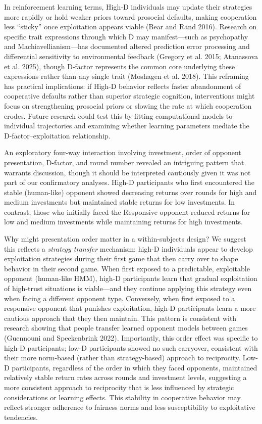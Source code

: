 \documentclass[
]{article}
\begin{document}
In reinforcement learning terms, High-D individuals may update their strategies more rapidly or hold weaker priors toward prosocial defaults, making cooperation less ``sticky'' once exploitation appears viable (Bear and Rand 2016).
Research on specific trait expressions through which D may manifest---such as psychopathy and Machiavellianism---has documented altered prediction error processing and differential sensitivity to environmental feedback (Gregory et al. 2015; Atanassova et al. 2025), though D-factor represents the common core underlying these expressions rather than any single trait (Moshagen et al. 2018).
This reframing has practical implications: if High-D behavior reflects faster abandonment of cooperative defaults rather than superior strategic cognition, interventions might focus on strengthening prosocial priors or slowing the rate at which cooperation erodes.
Future research could test this by fitting computational models to individual trajectories and examining whether learning parameters mediate the D-factor--exploitation relationship.

An exploratory four-way interaction involving investment, order of opponent presentation, D-factor, and round number revealed an intriguing pattern that warrants discussion, though it should be interpreted cautiously given it was not part of our confirmatory analyses.
High-D participants who first encountered the stable (human-like) opponent showed decreasing returns over rounds for high and medium investments but maintained stable returns for low investments.
In contrast, those who initially faced the Responsive opponent reduced returns for low and medium investments while maintaining returns for high investments.

Why might presentation order matter in a within-subjects design?
We suggest this reflects a \emph{strategy transfer} mechanism: high-D individuals appear to develop exploitation strategies during their first game that then carry over to shape behavior in their second game.
When first exposed to a predictable, exploitable opponent (human-like HMM), high-D participants learn that gradual exploitation of high-trust situations is viable---and they continue applying this strategy even when facing a different opponent type.
Conversely, when first exposed to a responsive opponent that punishes exploitation, high-D participants learn a more cautious approach that they then maintain.
This pattern is consistent with research showing that people transfer learned opponent models between games (Guennouni and Speekenbrink 2022).
Importantly, this order effect was specific to high-D participants; low-D participants showed no such carryover, consistent with their more norm-based (rather than strategy-based) approach to reciprocity.
Low-D participants, regardless of the order in which they faced opponents, maintained relatively stable return rates across rounds and investment levels, suggesting a more consistent approach to reciprocity that is less influenced by strategic considerations or learning effects.
This stability in cooperative behavior may reflect stronger adherence to fairness norms and less susceptibility to exploitative tendencies.
\end{document}
